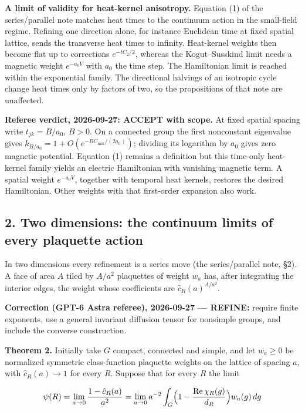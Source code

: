 \documentclass[11pt,a4paper]{article}
\begin{document}
\textbf{A limit of validity for heat-kernel anisotropy.} Equation (1) of
the series/parallel note matches heat times to the continuum action in
the small-field regime. Refining one direction alone, for instance
Euclidean time at fixed spatial lattice, sends the transverse heat times
to infinity. Heat-kernel weights then become flat up to corrections
\(e^{-tC_2/2}\), whereas the Kogut--Susskind limit needs a magnetic
weight \(e^{-a_0V}\) with \(a_0\) the time step. The Hamiltonian limit
is reached within the exponential family. The directional halvings of an
isotropic cycle change heat times only by factors of two, so the
propositions of that note are unaffected.

\textbf{Referee verdict, 2026-09-27: ACCEPT with scope.} At fixed
spatial spacing write \(t_{jk}=B/a_0\), \(B>0\). On a connected group
the first nonconstant eigenvalue gives
\(k_{B/a_0}=1+O(e^{-B C_{\min}/(2a_0)})\); dividing its logarithm by
\(a_0\) gives zero magnetic potential. Equation (1) remains a definition
but this time-only heat-kernel family yields an electric Hamiltonian
with vanishing magnetic term. A spatial weight \(e^{-a_0V}\), together
with temporal heat kernels, restores the desired Hamiltonian. Other
weights with that first-order expansion also work.

\hypertarget{two-dimensions-the-continuum-limits-of-every-plaquette-action}{%
\subsection{2. Two dimensions: the continuum limits of every plaquette
action}\label{two-dimensions-the-continuum-limits-of-every-plaquette-action}}

In two dimensions every refinement is a series move (the series/parallel
note, §2). A face of area \(A\) tiled by \(A/a^2\) plaquettes of weight
\(w_a\) has, after integrating the interior edges, the weight whose
coefficients are \(\hat c_R(a)^{A/a^2}\).

\textbf{Correction (GPT-6 Astra referee), 2026-09-27 --- REFINE:}
require finite exponents, use a general invariant diffusion tensor for
nonsimple groups, and include the converse construction.

\textbf{Theorem 2.} Initially take \(G\) compact, connected and simple,
and let \(w_a\ge0\) be normalized symmetric class-function plaquette
weights on the lattice of spacing \(a\), with \(\hat c_R(a)\to1\) for
every \(R\). Suppose that for every \(R\) the limit

\[\psi(R)=\lim_{a\to0}\frac{1-\hat c_R(a)}{a^2}
=\lim_{a\to0}a^{-2}\int_G\Bigl(1-\frac{{\rm Re}\,\chi_R(g)}{d_R}\Bigr)
w_a(g)\,dg\]
\end{document}
